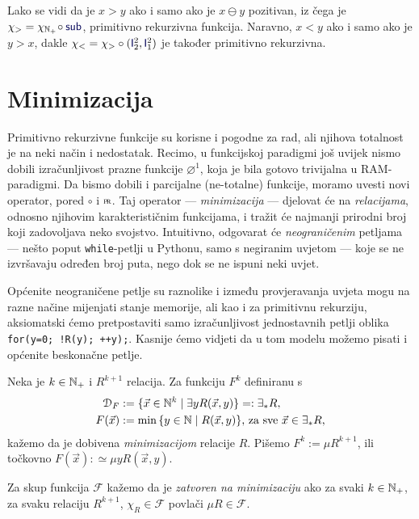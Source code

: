 \begin{primjer}[{name=[primitivna rekurzivnost relacija strogog uređaja]}]\label{pr:m-v}
Lako se vidi da je $x>y$ ako i samo ako je $x\ominus y$ pozitivan, iz čega je $\chi_>=\chi_{\N_+}\!\circ\f{sub}$, pri\-mi\-tiv\-no rekurzivna funkcija. Naravno, $x<y$ ako i samo ako je $y>x$, dakle $\chi_<=\chi_>\circ(\f I_2^2,\f I_1^2)$ je također primitivno rekurzivna.
\end{primjer}

\section{Minimizacija}

Primitivno rekurzivne funkcije su korisne i pogodne za rad, ali njihova totalnost je na neki način i nedostatak. Recimo, u funkcijskoj paradigmi još uvijek nismo dobili izračunljivost prazne funkcije $\varnothing^1$, koja je bila gotovo trivijalna u RAM-paradigmi. Da bismo dobili i parcijalne (ne-totalne) funkcije, moramo uvesti novi operator, pored $\circ$ i $\pr$. Taj operator --- \emph{minimizacija} --- djelovat će na \emph{relacijama}, odnosno njihovim karakterističnim funkcijama, i tražit će najmanji prirodni broj koji zadovoljava neko svojstvo. Intuitivno, odgovarat će \emph{neograničenim} petljama --- nešto poput \texttt{while}-petlji u Pythonu, samo s negiranim uvjetom --- koje se ne izvršavaju određen broj puta, nego dok se ne ispuni neki uvjet.

Općenite neograničene petlje su raznolike i između provjeravanja uvjeta mogu na razne načine mijenjati stanje memorije, ali kao i za primitivnu rekurziju, aksiomatski ćemo pretpostaviti samo izračunljivost jednostavnih petlji oblika
\texttt{for(y=0; !R(y); ++y);}.
Kasnije ćemo vidjeti da u tom modelu možemo pisati i općenite beskonačne petlje.

\begin{definicija}[{name=[minimizacija]}]
Neka je $k\in{\mathbb N}_+$ i $R^{k+1}$ relacija. Za funkciju $F^k$ definiranu s
\begin{align}
    \label{eq:dommu}\mathcal D_{F}&:=\{\vec x\in{\mathbb N}^k\mid\exists yR(\vec x,y)\}=:\exists_*R\text,\\
    F(\vec x)&:=\min\,\{y\in{\mathbb N}\mid R(\vec x,y)\}\text{, za sve $\vec x\in\exists_* R$,}
\end{align}
kažemo da je dobivena \emph{minimizacijom} relacije $R$. Pišemo $F^k:=\mu R^{k+1}$, ili točkovno
$F(\vec x):\simeq\mu yR(\vec x,y)$.

Za skup funkcija $\mathcal F$ kažemo da je \emph{zatvoren na minimizaciju} ako za svaki $k\in{\mathbb N}_+$, za svaku relaciju $R^{k+1}$, $\chi_R\in\mathcal F$ povlači $\mu R\in\mathcal F$. 
\end{definicija}

